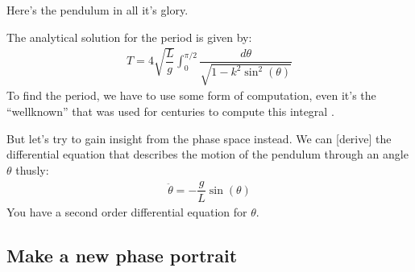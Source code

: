 \documentclass[letterpaper,10pt,english]{jupyterBook}
\begin{document}
\sphinxAtStartPar
Here’s the pendulum in all it’s glory.



\sphinxAtStartPar
The analytical solution for the period is given by:
\begin{equation*}
\begin{split}T = 4\sqrt{\dfrac{L}{g}}\int_0^{\pi/2}\dfrac{d\theta}{\sqrt{1-k^2\sin^2(\theta)}}\end{split}
\end{equation*}
\sphinxAtStartPar
To find the period, we have to use some form of computation, even it’s the “well\sphinxhyphen{}known”  that was used for centuries to compute this integral .

\sphinxAtStartPar
But let’s try to gain insight from the phase space instead. We can {[}derive{]} the differential equation that describes the motion of the pendulum through an angle \(\theta\) thusly:
\begin{equation*}
\begin{split}\ddot{\theta} = -\dfrac{g}{L}\sin(\theta)\end{split}
\end{equation*}
\sphinxAtStartPar
You have a second order differential equation for \(\theta\).


\subsection{Make a new phase portrait}
\label{\detokenize{content/1_mechanics/dynamical_1:make-a-new-phase-portrait}}
\sphinxAtStartPar
{}
\end{document}
